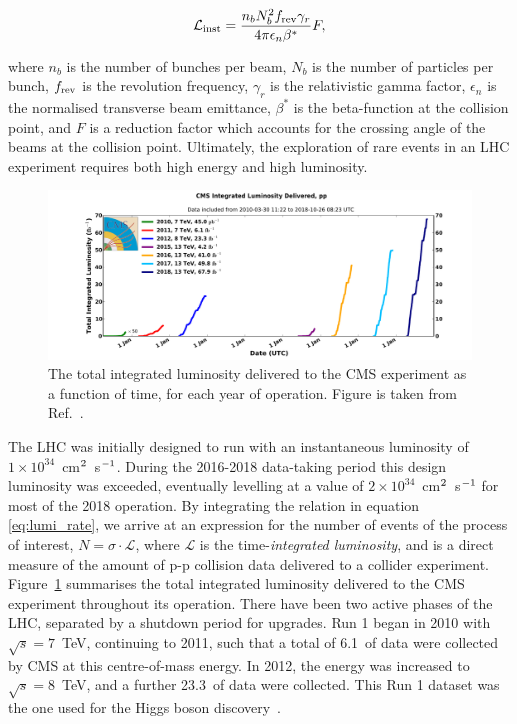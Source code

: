 \begin{equation}\label{eq:inst_lumi}
    \mathcal{L}_{\rm{inst}} = \frac{n_bN_b^2f_{\rm{rev}}\gamma_r}{4\pi\epsilon_n\beta^*}F,
\end{equation}

\noindent
where $n_b$ is the number of bunches per beam, $N_b$ is the number of particles per bunch, $f_{\rm{rev}}$ is the revolution frequency, $\gamma_r$ is the relativistic gamma factor, $\epsilon_n$ is the normalised transverse beam emittance, $\beta^*$ is the beta-function at the collision point, and $F$ is a reduction factor which accounts for the crossing angle of the beams at the collision point. Ultimately, the exploration of rare events in an LHC experiment requires both high energy and high luminosity.

\begin{figure}[htb!]
  \centering
  \includegraphics[width=1\textwidth]{Figures/cms/luminosity.pdf}
  \caption[The total integrated luminosity delivered to the CMS experiment]
  {
    The total integrated luminosity delivered to the CMS experiment as a function of time, for each year of operation.
    Figure is taken from Ref.~\cite{CMSLumiPublic}.
  }
  \label{fig:luminosity}
\end{figure}

The LHC was initially designed to run with an instantaneous luminosity of $1\times10^{34}$~cm$^{\rm{2}}$~s$^{\rm{-1}}$. During the 2016-2018 data-taking period this design luminosity was exceeded, eventually levelling at a value of $2 \times 10^{34}$~cm$^{\rm{2}}$~s$^{\rm{-1}}$ for most of the 2018 operation. By integrating the relation in equation \ref{eq:lumi_rate}, we arrive at an expression for the number of events of the process of interest, $N=\sigma\cdot\mathcal{L}$, where $\mathcal{L}$ is the time-\textit{integrated luminosity}, and is a direct measure of the amount of p-p collision data delivered to a collider experiment. Figure~\ref{fig:luminosity} summarises the total integrated luminosity delivered to the CMS experiment throughout its operation. There have been two active phases of the LHC, separated by a shutdown period for upgrades. Run 1 began in 2010 with $\sqrt{s}=7$~TeV, continuing to 2011, such that a total of 6.1~\fbinv of data were collected by CMS at this centre-of-mass energy. In 2012, the energy was increased to $\sqrt{s}=8$~TeV, and a further 23.3~\fbinv of data were collected. This Run 1 dataset was the one used for the Higgs boson discovery~\cite{}. 


